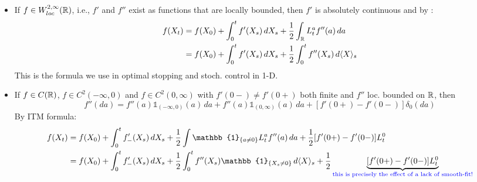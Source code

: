 \begin{remark}
    \begin{itemize}
        \item If $f \in W^{2,\infty}_{loc}(\mathbb R)$, i.e., $f'$ and $f''$ exist as functions that are locally bounded, then $f'$ is absolutely continuous and by :
        \begin{align*}
            f(X_t) &= f(X_0) + \int_0^t f'(X_s) \, dX_s + \frac{1}{2} \int_{\mathbb R} L_t^a f''(a) \, da \\
            &= f(X_0) + \int_0^t f'(X_s) \, dX_s + \frac{1}{2} \int_0^t f''(X_s) \, d\langle X \rangle_s
        \end{align*}
        This is the formula we use in optimal stopping and stoch. control in 1-D.

        \item If $f \in C(\mathbb R)$, $f \in C^2(-\infty, 0)$ and $f \in C^2(0, \infty)$ with $f'(0-) \neq f'(0+)$ both finite and $f''$ loc. bounded on $\mathbb R$, then 
        \[ f''(da) = f''(a) \mathbb{1}_{(-\infty, 0)}(a) \, da + f''(a) \mathbb{1}_{(0, \infty)}(a) \, da + [f'(0+) - f'(0-)] \delta_0(da) \]
        By ITM formula:
        \begin{align*}
            f(X_t) &= f(X_0) + \int_0^t f'_-(X_s) \, dX_s + \frac{1}{2} \int \mathbb{1}_{\{a \neq 0\}} L_t^a f''(a) \, da + \frac{1}{2} [f'(0+) - f'(0-)] L_t^0 \\
            &= f(X_0) + \int_0^t f'_-(X_s) \, dX_s + \frac{1}{2} \int_0^t f''(X_s) \mathbb{1}_{\{X_s \neq 0\}} \, d\langle X \rangle_s + \frac{1}{2} \underbrace{[f'(0+) - f'(0-)] L_t^0}_{\text{\color{blue}this is precisely the effect of a lack of smooth-fit!}}
        \end{align*}
    \end{itemize}
\end{remark}